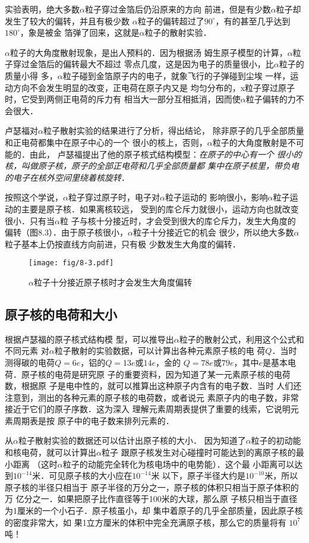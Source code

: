 实验表明，绝大多数$\alpha$粒子穿过金箔后仍沿原来的方向
前进，但是有少数$\alpha$粒子却发生了较大的偏转，并且有极少数
$\alpha$粒子的偏转超过了$90^{\circ}$，有的甚至几乎达到$180^{\circ}$，象是被金
箔弹了回来，这就是$\alpha$粒子的散射实验．

$\alpha$粒子的大角度散射现象，是出人预料的．因为根据汤
姆生原子模型的计算，$\alpha$粒子穿过金箔后的偏转最大不超过
零点几度，这是因为电子的质量很小，比$\alpha$粒子的质量小得
多，$\alpha$粒子碰到金箔原子内的电子，就象飞行的子弹碰到尘埃
一样，运动方向不会发生明显的改变，正电荷在原子内又是
均匀分布的，x粒子穿过原子时，它受到两侧正电荷的斥力有
相当大一部分互相抵消，因而使$\alpha$粒子偏转的力不会很大．

卢瑟福对$\alpha$粒子散射实验的结果进行了分析，得出结论，
除非原子的几乎全部质量和正电荷都集中在原子中心的一个
很小的核上，否则，$\alpha$粒子的大角度散射是不可能的．由此，
卢瑟福提出了他的原子核式结构模型：\textit{在原子的中心有一个
很小的核，叫做原子核，原子的全部正电荷和几乎全部质量都
集中在原子核里，带负电的电子在核外空间里绕着核旋转}．

按照这个学说，$\alpha$粒子穿过原子时，电子对$\alpha$粒子运动的
影响很小，影响$\alpha$粒子运动的主要是原子核．如果离核较远，
受到的库仑斥力就很小，运动方向也就改变很小．只有当$\alpha$粒
子与核十分接近时，才会受到很大的库仑斥力，发生大角度的
偏转（图8.3）．由于原子核很小，$\alpha$粒子十分接近它的机会
很少，所以绝大多数$\alpha$粒子基本上仍按直线方向前进，只有极
少数发生大角度的偏转．
\begin{figure}[htp]
    \centering
    \texttt{[image: fig/8-3.pdf]}
    \caption{$\alpha$粒子十分接近原子核时才会发生大角度偏转}
\end{figure}


\subsection{原子核的电荷和大小} 

根据卢瑟福的原子核式结构模
型，可以推导出$\alpha$粒子的散射公式，利用这个公式和不同元素
对$\alpha$粒子散射的实验数据，可以计算出各种元素原子核的电
荷$Q$．当时测得碳的电荷$Q=6e$，铝的$Q=13e$或$14e$，金的
$Q=78e$或$79e$，其中$e$是基本电荷．原子核的电荷是研究原
子的重要资料，因为知道了某一元素原子核的电荷数，根据原
子是电中性的，就可以推算出这种原子内含有的电子数．当时
人们还注意到，测出的各种元素的原子核的电荷数，或者说元
素原子内的电子数，非常接近于它们的原子序数．这为深入
理解元素周期表提供了重要的线索，它说明元素周期表是按
原子中的电子数来排列元素的．

从$\alpha$粒子散射实验的数据还可以估计出原子核的大小．
因为知道了$\alpha$粒子的初动能和核电荷，就可以计算出$\alpha$粒子
跟原子核发生对心碰撞时可能达到的离原子核的最小距离
（这时$\alpha$粒子的动能完全转化为核电场中的电势能）．这个最
小距离可以达到$10^{-14}$米．可见原子核的大小应在$10^{-14}$米
以下，原子半径大约是$10^{-10}$米，所以原子核的半径只相当于
原子半径的万分之一，原子核的体积只相当于原子体积的万
亿分之一．如果把原子比作直径等于100米的大球，那么原
子核只相当于直径为1厘米的一个小石子．原子核虽小，却
集中着原子的几乎全部质量，因此原子核的密度非常大，如
果1立方厘米的体积中完全充满原子核，那么它的质量将有
$10^7$吨！

